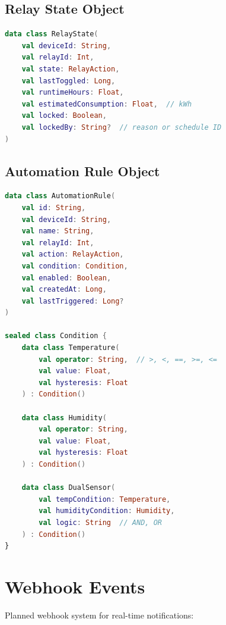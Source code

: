 \subsection{Relay State Object}

\begin{lstlisting}[language=kotlin, caption=Relay State Structure, label=lst:relay_state_object]
data class RelayState(
    val deviceId: String,
    val relayId: Int,
    val state: RelayAction,
    val lastToggled: Long,
    val runtimeHours: Float,
    val estimatedConsumption: Float,  // kWh
    val locked: Boolean,
    val lockedBy: String?  // reason or schedule ID
)
\end{lstlisting}

\subsection{Automation Rule Object}

\begin{lstlisting}[language=kotlin, caption=Automation Rule Structure, label=lst:rule_object]
data class AutomationRule(
    val id: String,
    val deviceId: String,
    val name: String,
    val relayId: Int,
    val action: RelayAction,
    val condition: Condition,
    val enabled: Boolean,
    val createdAt: Long,
    val lastTriggered: Long?
)

sealed class Condition {
    data class Temperature(
        val operator: String,  // >, <, ==, >=, <=
        val value: Float,
        val hysteresis: Float
    ) : Condition()
    
    data class Humidity(
        val operator: String,
        val value: Float,
        val hysteresis: Float
    ) : Condition()
    
    data class DualSensor(
        val tempCondition: Temperature,
        val humidityCondition: Humidity,
        val logic: String  // AND, OR
    ) : Condition()
}
\end{lstlisting}

\section{Webhook Events}

Planned webhook system for real-time notifications:

